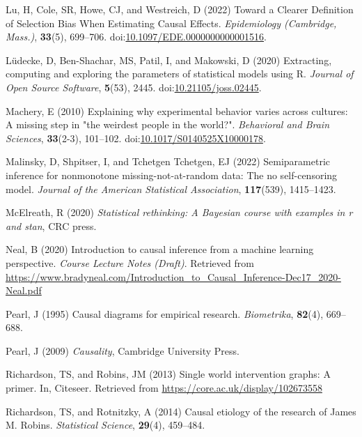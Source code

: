 \documentclass[
  single column]{article}
\newlength{\cslhangindent}
\newenvironment{CSLReferences}[2] %
 {\begin{list}{}{%
  \setlength{\itemindent}{0pt}
  \setlength{\leftmargin}{0pt}
  \setlength{\parsep}{0pt}
  \ifodd #1
   \setlength{\leftmargin}{\cslhangindent}
   \setlength{\itemindent}{-1\cslhangindent}
  \fi
  \setlength{\itemsep}{#2\baselineskip}}}
 {\end{list}}
\begin{document}
\begin{CSLReferences}{1}{0}
Lu, H, Cole, SR, Howe, CJ, and Westreich, D (2022) Toward a Clearer
Definition of Selection Bias When Estimating Causal Effects.
\emph{Epidemiology (Cambridge, Mass.)}, \textbf{33}(5), 699--706.
doi:\href{https://doi.org/10.1097/EDE.0000000000001516}{10.1097/EDE.0000000000001516}.

Lüdecke, D, Ben-Shachar, MS, Patil, I, and Makowski, D (2020)
Extracting, computing and exploring the parameters of statistical models
using {R}. \emph{Journal of Open Source Software}, \textbf{5}(53), 2445.
doi:\href{https://doi.org/10.21105/joss.02445}{10.21105/joss.02445}.

Machery, E (2010) Explaining why experimental behavior varies across
cultures: A missing step in "the weirdest people in the world?".
\emph{Behavioral and Brain Sciences}, \textbf{33}(2-3), 101--102.
doi:\href{https://doi.org/10.1017/S0140525X10000178}{10.1017/S0140525X10000178}.

Malinsky, D, Shpitser, I, and Tchetgen Tchetgen, EJ (2022)
Semiparametric inference for nonmonotone missing-not-at-random data: The
no self-censoring model. \emph{Journal of the American Statistical
Association}, \textbf{117}(539), 1415--1423.

McElreath, R (2020) \emph{Statistical rethinking: A {B}ayesian course
with examples in r and stan}, CRC press.

Neal, B (2020) Introduction to causal inference from a machine learning
perspective. \emph{Course Lecture Notes (Draft)}. Retrieved from
\url{https://www.bradyneal.com/Introduction_to_Causal_Inference-Dec17_2020-Neal.pdf}

Pearl, J (1995) Causal diagrams for empirical research.
\emph{Biometrika}, \textbf{82}(4), 669--688.

Pearl, J (2009) \emph{Causality}, Cambridge University Press.

Richardson, TS, and Robins, JM (2013) Single world intervention graphs:
A primer. In, Citeseer. Retrieved from
\url{https://core.ac.uk/display/102673558}

Richardson, TS, and Rotnitzky, A (2014) Causal etiology of the research
of {J}ames {M}. {R}obins. \emph{Statistical Science}, \textbf{29}(4),
459--484.


\end{CSLReferences}
\end{document}
